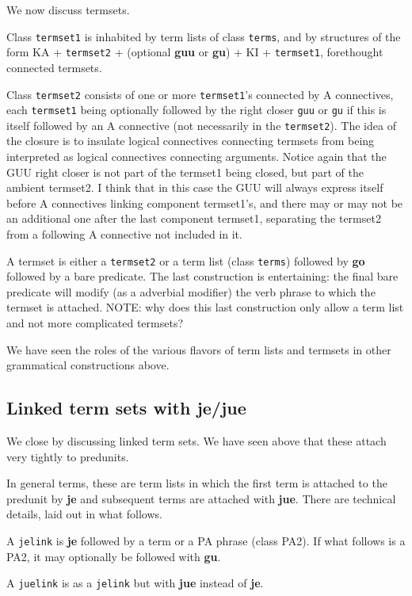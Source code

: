 \documentclass[12pt]{book}
\begin{document}
{We now discuss termsets.

Class {\tt termset1} is inhabited by term lists of class {\tt terms}, and by structures of the form KA + {\tt termset2} + (optional {\bf guu} or {\bf gu}) + KI + {\tt termset1}, forethought connected termsets.

Class {\tt termset2} consists of one or more {\tt termset1}'s connected by A connectives, each {\tt termset1} being optionally followed by
the right closer {\tt guu} or {\tt gu} if this is itself followed by an A connective (not necessarily in the {\tt termset2}).  The idea of the closure is to insulate logical connectives connecting termsets
from being interpreted as logical connectives connecting arguments.  Notice again that the GUU right closer is not part of the termset1 being closed,
but part of the ambient termset2.  I think that in this case the GUU will always express itself before A connectives linking component termset1's, and there may or may not be an additional one after the last component termset1, separating the termset2 from a following A connective not included in it.

A termset is either a {\tt termset2} or a term list (class {\tt terms}) followed by {\bf go} followed by a bare predicate.  The last construction is entertaining:  the final bare predicate will modify (as a adverbial modifier)  the verb phrase to which the termset is attached.  NOTE:  why does this last construction only allow a term list and not more complicated termsets?

We have seen the roles of the various flavors of term lists and termsets in other grammatical constructions above.


\subsection{Linked term sets with {\bf je/jue}}

We close by discussing linked term sets.  We have seen above that these attach very tightly to predunits.

In general terms, these are term lists in which the first term is attached to the predunit by {\bf je} and subsequent terms are attached
with {\bf jue}.  There are technical details, laid out in what follows.

A {\tt jelink} is {\bf je} followed by a term or a PA phrase (class PA2).  If what follows is a PA2, it may optionally be followed with {\bf gu}.

A {\tt juelink} is as a {\tt jelink} but with {\bf jue} instead of {\bf je}.

}
\end{document}
